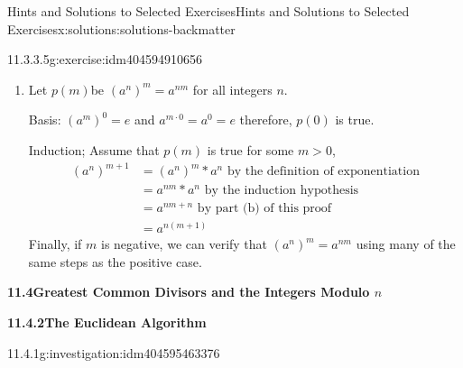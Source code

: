 \documentclass[twoside,10pt,]{book}
\numberwithin{equation}{section}
\begin{document}
\begin{solutions-chapter}{Hints and Solutions to Selected Exercises}{}{Hints and Solutions to Selected Exercises}{}{}{x:solutions:solutions-backmatter}
\begin{divisionsolution}{11.3.3.5}{}{g:exercise:idm404594910656}
\begin{enumerate}[label=(\alph*)]
\par
Induction: Assume that for some \(m > 1\), \(p(m)\) is true. Then%
\begin{equation*}
\begin{split}
a^{n+(m+1)}&= a^{(n+m)+1}\textrm{      by the associativity of integer addition}\\
&=a^{n+m}*a^1\textrm{    by the definition of exponentiation}\\
&=\left(a^n*a^m\right)*a^1 \textrm{     by the induction hypothesis}\\
&= a^n*\left(a^m*a^1\right)\textrm{     by associativity}\\
&= a^n*a^{m+1}\textrm{    by the definition of exponentiation}
\end{split}
\end{equation*}
To complete the proof, you need to consider the cases where \(m\) and\slash{}or \(n\) are negative.%
\item{}Let \(p(m)\)be \(\left(a^n\right)^m= a^{n m}\) for all integers \(n\).%
\par
Basis: \(\left(a^m\right)^0= e\) and \(a^{m\cdot 0}=a^0= e\) therefore, \(p(0)\) is true.%
\par
Induction; Assume that \(p(m)\) is true for some \(m >\)0,%
\begin{equation*}
\begin{split}
\left(a^n\right)^{m+1}&=\left(a^n\right)^m*a^n \textrm{     by the definition of exponentiation}\\
&=a^{n m}*a^n\textrm{      by the induction hypothesis}\\
& =a^{n m + n}\textrm{      by part (b)  of this proof}\\
& =a^{n(m+1)}
\end{split}
\end{equation*}
Finally, if \(m\) is negative, we can verify that \(\left(a^n\right)^m= a^{n m}\) using many of the same steps as the positive case.%
\end{enumerate}
%
\end{divisionsolution}%
\par\smallskip
\noindent\textbf{\Large{}11.4\space\textperiodcentered\space{}Greatest Common Divisors  and the Integers Modulo \(n\)}
\par\smallskip
\par\smallskip
\noindent\textbf{\Large{}11.4.2\space\textperiodcentered\space{}The Euclidean Algorithm}
\par\smallskip
\begin{investigationsolution}{11.4.1}{}{g:investigation:idm404595463376}%

\end{investigationsolution}
\end{solutions-chapter}
\end{document}
